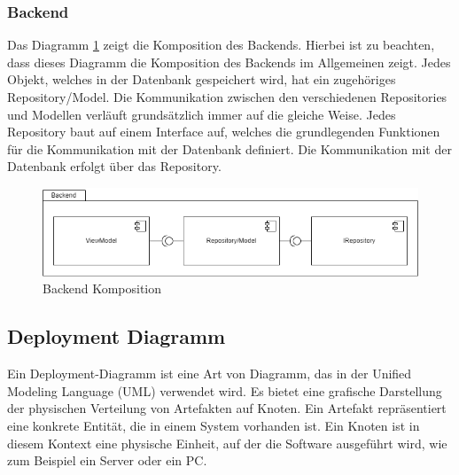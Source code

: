 \subsubsection{Backend}
Das Diagramm \ref*{fig:BackendKomposition} zeigt die Komposition des Backends. Hierbei ist zu beachten, dass dieses Diagramm die Komposition des Backends im Allgemeinen zeigt. Jedes Objekt, welches in der Datenbank gespeichert wird, hat ein zugehöriges Repository/Model. Die Kommunikation zwischen den verschiedenen Repositories und Modellen verläuft grundsätzlich immer auf die gleiche Weise. Jedes Repository baut auf einem Interface auf, welches die grundlegenden Funktionen für die Kommunikation mit der Datenbank definiert. Die Kommunikation mit der Datenbank erfolgt über das Repository.
\begin{figure}[H]
    \centering
    \includegraphics[width=0.\textwidth]{images/diagramme/Backend.png}
    \caption{Backend Komposition}
    \label{fig:BackendKomposition}
\end{figure}
\newpage
\subsection{Deployment Diagramm} \label{Deployment Diagramm}
Ein Deployment-Diagramm ist eine Art von Diagramm, das in der Unified Modeling Language (UML) verwendet wird. Es bietet eine grafische Darstellung der physischen Verteilung von Artefakten auf Knoten. Ein Artefakt repräsentiert eine konkrete Entität, die in einem System vorhanden ist. Ein Knoten ist in diesem Kontext eine physische Einheit, auf der die Software ausgeführt wird, wie zum Beispiel ein Server oder ein PC.\newline

